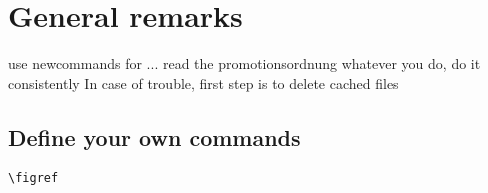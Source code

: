 \chapter{General remarks}\label{cha:remarks}

use newcommands for ...
read the promotionsordnung
whatever you do, do it consistently
In case of trouble, first step is to delete cached files

\section{Define your own commands}
\verb|\figref|
